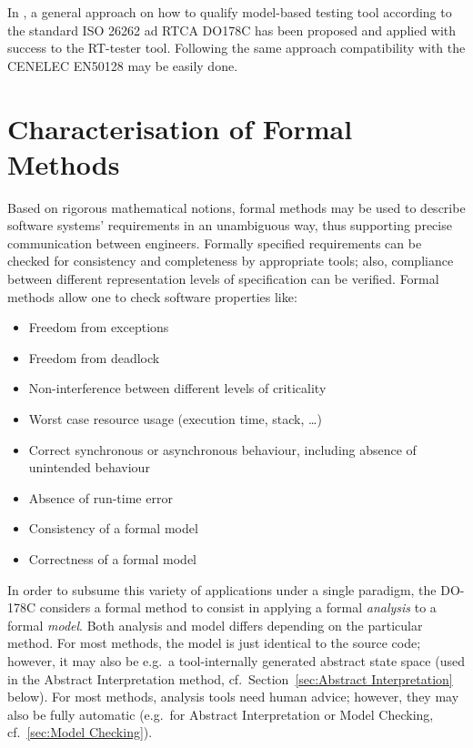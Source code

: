 In \cite{brauer_efficient_2012}, a general approach  on how to qualify
model-based testing tool according to the standard ISO 26262 ad RTCA
DO178C has been proposed and applied with success to the RT-tester
tool. Following the same  approach compatibility with the CENELEC EN50128
may be easily done. 


\chapter{Characterisation of Formal Methods}

Based on rigorous mathematical notions, formal methods may be used
to describe software systems' requirements in an unambiguous way,
thus supporting precise communication between engineers.
%
Formally specified requirements can be checked for consistency and
completeness by appropriate tools;
also, compliance between different representation levels of
specification can be verified.
%
Formal methods allow one to check software properties like:

\begin{itemize}
\item Freedom from exceptions
\item Freedom from deadlock
\item Non-interference between different levels of criticality
\item Worst case resource usage (execution time, stack, \ldots)
\item Correct synchronous or asynchronous behaviour,
        including absence of unintended behaviour
\item Absence of run-time error
\item Consistency of a formal model
\item Correctness of a formal model
\end{itemize}


In order to subsume this variety of applications under a single
paradigm,
the DO-178C
considers a formal method to consist in applying a
formal {\em analysis} to a formal {\em model}.
%
Both analysis and model differs depending on the particular method.
%
For most methods, the model
is just identical to the source code; however, it may
also be e.g.\ a tool-internally generated abstract state space (used
in the Abstract Interpretation method, cf.\
Section~\ref{sec:Abstract Interpretation} below).
%
For most methods, analysis tools need human advice;
however, they may also be fully automatic (e.g.\ for 
Abstract Interpretation or Model Checking, cf.\
\ref{sec:Model Checking}).

